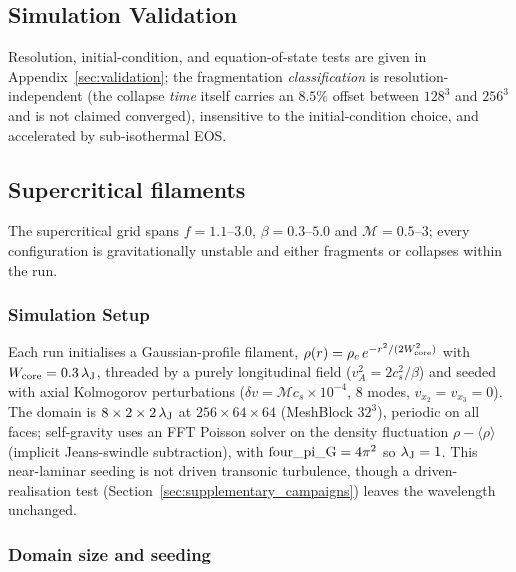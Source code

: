 \documentclass[usenatbib,twoside,twocolumn]{mnras}
\begin{document}
\subsection{Simulation Validation}

Resolution, initial-condition, and equation-of-state tests are given in Appendix~\ref{sec:validation}; the fragmentation \emph{classification} is resolution-independent (the collapse \emph{time} itself carries an $8.5\%$ offset between $128^3$ and $256^3$ and is not claimed converged), insensitive to the initial-condition choice, and accelerated by sub-isothermal EOS.


\subsection{Supercritical filaments}
\label{sec:supercrit}

The supercritical grid spans $f=1.1$--$3.0$, $\beta=0.3$--$5.0$ and $\mathcal{M}=0.5$--$3$; every configuration is gravitationally unstable and either fragments or collapses within the run.

\subsubsection{Simulation Setup}

Each run initialises a Gaussian-profile filament, $\rho(r)=\rho_c\,e^{-r^2/(2W_{\rm core}^2)}$ with $W_{\rm core}=0.3\,\lambda_{\rm J}$, threaded by a purely longitudinal field ($v_A^2=2c_s^2/\beta$) and seeded with axial Kolmogorov perturbations ($\delta v=\mathcal{M}c_s\times10^{-4}$, 8 modes, $v_{x_2}=v_{x_3}=0$). The domain is $8\times2\times2\,\lambda_{\rm J}$ at $256\times64\times64$ (MeshBlock $32^3$), periodic on all faces; self-gravity uses an FFT Poisson solver on the density fluctuation $\rho-\langle\rho\rangle$ (implicit Jeans-swindle subtraction), with ${\rm four\_pi\_G}=4\pi^2$ so $\lambda_{\rm J}=1$. This near-laminar seeding is not driven transonic turbulence, though a driven-realisation test (Section~\ref{sec:supplementary_campaigns}) leaves the wavelength unchanged.

\subsubsection{Domain size and seeding}
\end{document}
